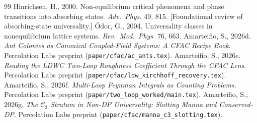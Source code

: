 \documentclass[11pt,a4paper]{article}
\theoremstyle{plain}
\theoremstyle{definition}
\begin{document}
\begin{thebibliography}{99}
 Hinrichsen, H., 2000. Non-equilibrium critical phenomena and phase transitions into absorbing states. \textit{Adv.\ Phys.} 49, 815. [Foundational review of absorbing-state universality.]
 \'Odor, G., 2004. Universality classes in nonequilibrium lattice systems. \textit{Rev.\ Mod.\ Phys.} 76, 663.
 Amarteifio, S., 2026d. \textit{Ant Colonies as Canonical Coupled-Field Systems: A CFAC Recipe Book}. Percolation Labs preprint (\texttt{paper/cfac/ac\_ants.tex}).
 Amarteifio, S., 2026e. \textit{Reading the LDWC Two-Loop Roughness Coefficient Through the CFAC Lens}. Percolation Labs preprint (\texttt{paper/cfac/ldw\_kirchhoff\_recovery.tex}).
 Amarteifio, S., 2026f. \textit{Multi-Loop Feynman Integrals as Counting Problems}. Percolation Labs preprint (\texttt{paper/two\_loop\_worked/main.tex}).
 Amarteifio, S., 2026g. \textit{The $\mathcal{C}_3$ Stratum in Non-DP Universality: Slotting Manna and Conserved-DP}. Percolation Labs preprint (\texttt{paper/cfac/manna\_c3\_slotting.tex}).

\end{thebibliography}
\end{document}

